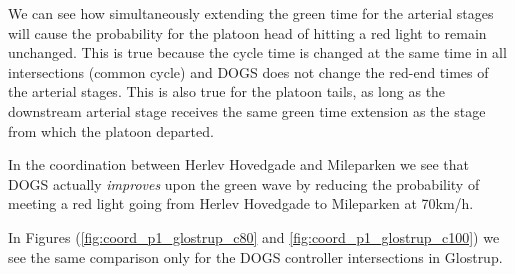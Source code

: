 We can see how simultaneously extending the green time for the arterial stages will cause the probability for the platoon head of hitting a red light to remain unchanged. This is true because the cycle time is changed at the same time in all intersections (common cycle) and DOGS does not change the red-end times of the arterial stages.
This is also true for the platoon tails, as long as the downstream arterial stage receives the same green time extension as the stage from which the platoon departed.

In the coordination between Herlev Hovedgade and Mileparken we see that DOGS actually \textit{improves} upon the green wave by reducing the probability of meeting a red light going from Herlev Hovedgade to Mileparken at 70km/h.

In Figures (\ref{fig:coord_p1_glostrup_c80} and \ref{fig:coord_p1_glostrup_c100}) we see the same comparison only for the DOGS controller intersections in Glostrup.

